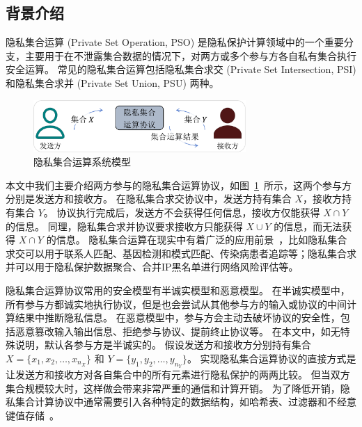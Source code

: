 \subsection{背景介绍}

隐私集合运算 (Private Set Operation, PSO) 是隐私保护计算领域中的一个重要分支，主要用于在不泄露集合数据的情况下，对两方或多个参与方各自私有集合执行安全运算。
常见的隐私集合运算包括隐私集合求交 (Private Set Intersection, PSI) 和隐私集合求并 (Private Set Union, PSU) 两种。
\begin{figure}[ht]
  \centering
  \includegraphics[width=0.72\textwidth]{figures/pso_pro.pdf}
  \caption{隐私集合运算系统模型}
  \label{fig:pso_protocol}
\end{figure}
本文中我们主要介绍两方参与的隐私集合运算协议，如图~\ref{fig:pso_protocol}~所示，这两个参与方分别是发送方和接收方。
在隐私集合求交协议中，发送方持有集合 $X$，接收方持有集合 $Y$。
协议执行完成后，发送方不会获得任何信息，接收方仅能获得 $X\cap Y$ 的信息。
同理，隐私集合求并协议要求接收方只能获得 $X\cup Y$ 的信息，而无法获得 $X\cap Y$ 的信息。
隐私集合运算在现实中有着广泛的应用前景~\cite{zhang2024survey}，比如隐私集合求交可以用于联系人匹配、基因检测和模式匹配、传染病患者追踪等；隐私集合求并可以用于隐私保护数据聚合、合并IP黑名单进行网络风险评估等。

隐私集合运算协议常用的安全模型有半诚实模型和恶意模型。
在半诚实模型中，所有参与方都诚实地执行协议，但是也会尝试从其他参与方的输入或协议的中间计算结果中推断隐私信息。
在恶意模型中，参与方会主动去破坏协议的安全性，包括恶意篡改输入输出信息、拒绝参与协议、提前终止协议等。
在本文中，如无特殊说明，默认各参与方是半诚实的。
假设发送方和接收方分别持有集合 $X=\{x_1, x_2, \dots, x_{n_X}\}$ 和 $Y=\{y_1, y_2, \dots, y_{n_Y}\}$。
实现隐私集合运算协议的直接方式是让发送方和接收方对各自集合中的所有元素进行隐私保护的两两比较。
但当双方集合规模较大时，这样做会带来非常严重的通信和计算开销。
为了降低开销，隐私集合计算协议中通常需要引入各种特定的数据结构，如哈希表、过滤器和不经意键值存储~\cite{zhang2024survey}。

